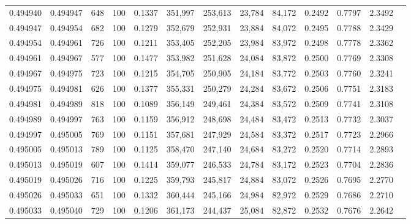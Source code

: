 \begin{tabular}{rrrrrrrrrrrrr}
0.494940 & 0.494947 &   648 & 100 &                                     0.1337 & 351,997 & 253,613 &  23,784 &  84,172 & 0.2492 & 0.7797 & 2.3492 \\
0.494947 & 0.494954 &   682 & 100 &                                     0.1279 & 352,679 & 252,931 &  23,884 &  84,072 & 0.2495 & 0.7788 & 2.3429 \\
0.494954 & 0.494961 &   726 & 100 &                                     0.1211 & 353,405 & 252,205 &  23,984 &  83,972 & 0.2498 & 0.7778 & 2.3362 \\
0.494961 & 0.494967 &   577 & 100 &                                     0.1477 & 353,982 & 251,628 &  24,084 &  83,872 & 0.2500 & 0.7769 & 2.3308 \\
0.494967 & 0.494975 &   723 & 100 &                                     0.1215 & 354,705 & 250,905 &  24,184 &  83,772 & 0.2503 & 0.7760 & 2.3241 \\
0.494975 & 0.494981 &   626 & 100 &                                     0.1377 & 355,331 & 250,279 &  24,284 &  83,672 & 0.2506 & 0.7751 & 2.3183 \\
0.494981 & 0.494989 &   818 & 100 &                                     0.1089 & 356,149 & 249,461 &  24,384 &  83,572 & 0.2509 & 0.7741 & 2.3108 \\
0.494989 & 0.494997 &   763 & 100 &                                     0.1159 & 356,912 & 248,698 &  24,484 &  83,472 & 0.2513 & 0.7732 & 2.3037 \\
0.494997 & 0.495005 &   769 & 100 &                                     0.1151 & 357,681 & 247,929 &  24,584 &  83,372 & 0.2517 & 0.7723 & 2.2966 \\
0.495005 & 0.495013 &   789 & 100 &                                     0.1125 & 358,470 & 247,140 &  24,684 &  83,272 & 0.2520 & 0.7714 & 2.2893 \\
0.495013 & 0.495019 &   607 & 100 &                                     0.1414 & 359,077 & 246,533 &  24,784 &  83,172 & 0.2523 & 0.7704 & 2.2836 \\
0.495019 & 0.495026 &   716 & 100 &                                     0.1225 & 359,793 & 245,817 &  24,884 &  83,072 & 0.2526 & 0.7695 & 2.2770 \\
0.495026 & 0.495033 &   651 & 100 &                                     0.1332 & 360,444 & 245,166 &  24,984 &  82,972 & 0.2529 & 0.7686 & 2.2710 \\
0.495033 & 0.495040 &   729 & 100 &                                     0.1206 & 361,173 & 244,437 &  25,084 &  82,872 & 0.2532 & 0.7676 & 2.2642 \\

\end{tabular}
